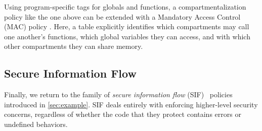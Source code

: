 \documentclass{llncs}
\begin{document}
Using program-specific tags for globals and functions, a compartmentalization policy
like the one above can be extended with a Mandatory Access Control (MAC) policy \cite{}.
Here, a table explicitly identifies which compartments may call one another's functions,
which global variables they can access, and with which other compartments they can share
memory.

\subsection{Secure Information Flow}

Finally, we return to the family of 
{\em secure information flow} (SIF)~\cite{Denning77:SecureInformationFlow} policies
introduced in \cref{sec:example}. 
SIF deals entirely with enforcing
higher-level security concerns, regardless of whether the code that they protect contains
errors or undefined behaviors.
\end{document}
